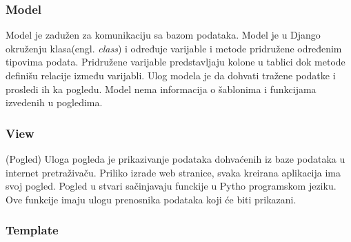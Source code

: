 \documentclass[12pt]{article}
\begin{document}
\subsubsection{Model}
Model je zadužen za komunikaciju sa bazom podataka. Model je u Django okruženju klasa(engl. \textsl{class}) i određuje varijable i metode pridružene određenim tipovima podata. Pridružene varijable predstavljaju kolone u tablici dok metode definišu relacije između varijabli.  Ulog modela je da dohvati tražene podatke i prosledi ih ka pogledu.  Model nema informacija o šablonima i funkcijama izvedenih u pogledima.
\subsubsection{View}(Pogled)
Uloga pogleda je prikazivanje podataka dohvaćenih iz baze podataka u internet pretraživaču. Priliko izrade web stranice, svaka kreirana aplikacija ima svoj pogled.  Pogled u stvari sačinjavaju funckije u Pytho programskom jeziku.  Ove funkcije imaju ulogu prenosnika podataka koji će biti prikazani. 
\subsubsection{Template}
\newpage
\end{document}
